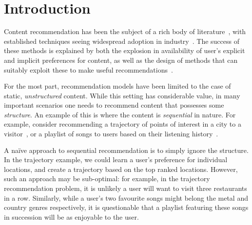 
\secmoveup
\section{Introduction}
\label{sec:intro}
\textmoveup

Content recommendation has been the subject of a rich body of literature~\citep{Goldberg:1992,Sarwar:2001,Koren:2010},
with established techniques seeing widespread adoption in industry~\citep{Linden:2003,Agarwal:2013,Amatriain:2015,Gomez-Uribe:2015}.
The success of these methods is explained by both the explosion in availability of user's explicit and implicit preferences for content,
as well as the design of methods that can suitably exploit these to make useful recommendations~\citep{Koren:2009}.

For the most part, recommendation models have been limited to the case of static, \emph{unstructured} content.
While this setting has considerable value,
in many important scenarios one needs to recommend content that possesses some \emph{structure}.
An example of this is where the content is \emph{sequential} in nature.
For example, consider %
recommending a trajectory of points of interest in a city to a visitor~\citep{lu2010photo2trip,lu2012personalized,ijcai15,cikm16paper},
or
a playlist of songs to users based on their listening history~\citep{McFee:2011,chen2012playlist,hidasi2015session,choi2016towards}.

A na\"{i}ve approach to sequential recommendation is to simply ignore the structure.
In the trajectory example, we could learn a user's preference for individual locations,
and create a trajectory based on the top ranked locations.
However, such an approach may be sub-optimal:
for example,
in the trajectory recommendation problem, it is unlikely a user will want to visit three restaurants in a row.
Similarly, 
while a user's two favourite songs might belong
the metal and country genres respectively,
it is questionable that a playlist featuring these songs in succession will be as enjoyable to the user.

